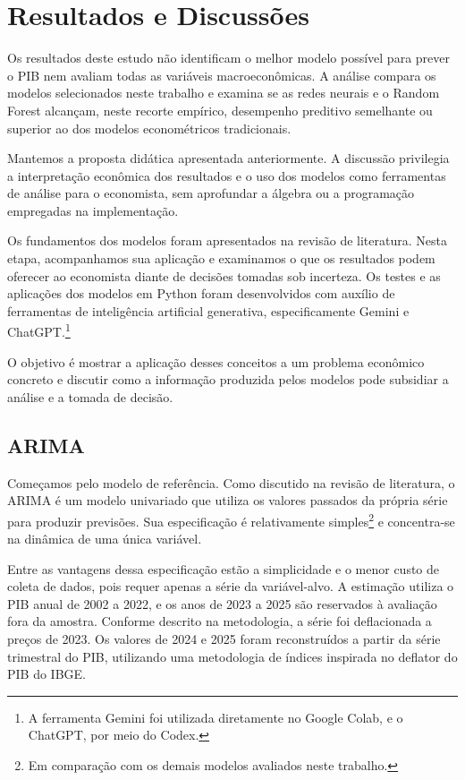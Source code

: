 \chapter{Resultados e Discussões}
\label{chap:resultados}

Os resultados deste estudo não identificam o melhor modelo possível para prever o PIB nem avaliam todas as variáveis macroeconômicas. A análise compara os modelos selecionados neste trabalho e examina se as redes neurais e o Random Forest alcançam, neste recorte empírico, desempenho preditivo semelhante ou superior ao dos modelos econométricos tradicionais.


Mantemos a proposta didática apresentada anteriormente. A discussão privilegia a interpretação econômica dos resultados e o uso dos modelos como ferramentas de análise para o economista, sem aprofundar a álgebra ou a programação empregadas na implementação.

Os fundamentos dos modelos foram apresentados na revisão de literatura. Nesta etapa, acompanhamos sua aplicação e examinamos o que os resultados podem oferecer ao economista diante de decisões tomadas sob incerteza. Os testes e as aplicações dos modelos em Python foram desenvolvidos com auxílio de ferramentas de inteligência artificial generativa, especificamente Gemini e ChatGPT.\footnote{A ferramenta Gemini foi utilizada diretamente no Google Colab, e o ChatGPT, por meio do Codex.}

O objetivo é mostrar a aplicação desses conceitos a um problema econômico concreto e discutir como a informação produzida pelos modelos pode subsidiar a análise e a tomada de decisão.


\section{ARIMA}

Começamos pelo modelo de referência. Como discutido na revisão de literatura, o ARIMA é um modelo univariado que utiliza os valores passados da própria série para produzir previsões. Sua especificação é relativamente simples\footnote{Em comparação com os demais modelos avaliados neste trabalho.} e concentra-se na dinâmica de uma única variável.

Entre as vantagens dessa especificação estão a simplicidade e o menor custo de coleta de dados, pois requer apenas a série da variável-alvo. A estimação utiliza o PIB anual de 2002 a 2022, e os anos de 2023 a 2025 são reservados à avaliação fora da amostra. Conforme descrito na metodologia, a série foi deflacionada a preços de 2023. Os valores de 2024 e 2025 foram reconstruídos a partir da série trimestral do PIB, utilizando uma metodologia de índices inspirada no deflator do PIB do IBGE.

